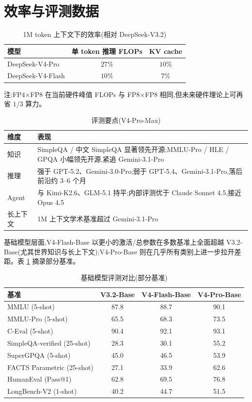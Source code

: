 \documentclass{MathNoteCN}
\begin{document}
\section{效率与评测数据}

\begin{table}[h]
\centering
\caption{1M token 上下文下的效率(相对 DeepSeek-V3.2)}
\begin{tabular}{lcc}
\hline
模型 & 单 token 推理 FLOPs & KV cache \\
\hline
DeepSeek-V4-Pro   & $27\%$ & $10\%$ \\
DeepSeek-V4-Flash & $10\%$ & $7\%$  \\
\hline
\end{tabular}
\end{table}

注:FP4$\times$FP8 在当前硬件峰值 FLOPs 与 FP8$\times$FP8 相同,但未来硬件理论上可再省 $1/3$ 算力。

\begin{table}[h]
\centering
\caption{评测要点(V4-Pro-Max)}
\begin{tabular}{lp{9.5cm}}
\hline
维度 & 表现 \\
\hline
知识 & SimpleQA / 中文 SimpleQA 显著领先开源;MMLU-Pro / HLE / GPQA 小幅领先开源,紧追 Gemini-3.1-Pro \\
推理 & 强于 GPT-5.2、Gemini-3.0-Pro;弱于 GPT-5.4、Gemini-3.1-Pro,落后前沿约 3--6 个月 \\
Agent & 与 Kimi-K2.6、GLM-5.1 持平;内部评测优于 Claude Sonnet 4.5,接近 Opus 4.5 \\
长上下文 & 1M 上下文学术基准超过 Gemini-3.1-Pro \\
\hline
\end{tabular}
\end{table}

基础模型层面,V4-Flash-Base 以更小的激活/总参数在多数基准上全面超越 V3.2-Base(尤其世界知识与长上下文);V4-Pro-Base 则在几乎所有类别上进一步拉开差距。表 \ref{tab:baseeval} 摘录部分基准。

\begin{table}[h]
\centering
\caption{基础模型评测对比(部分基准)\cite{arxiv}}
\label{tab:baseeval}
\begin{tabular}{lccc}
\hline
基准 & V3.2-Base & V4-Flash-Base & V4-Pro-Base \\
\hline
MMLU (5-shot) & 87.8 & 88.7 & 90.1 \\
MMLU-Pro (5-shot) & 65.5 & 68.3 & 73.5 \\
C-Eval (5-shot) & 90.4 & 92.1 & 93.1 \\
SimpleQA-verified (25-shot) & 28.3 & 30.1 & 55.2 \\
SuperGPQA (5-shot) & 45.0 & 46.5 & 53.9 \\
FACTS Parametric (25-shot) & 27.1 & 33.9 & 62.6 \\
HumanEval (Pass@1) & 62.8 & 69.5 & 76.8 \\
LongBench-V2 (1-shot) & 40.2 & 44.7 & 51.5 \\
\hline
\end{tabular}
\end{table}
\end{document}
